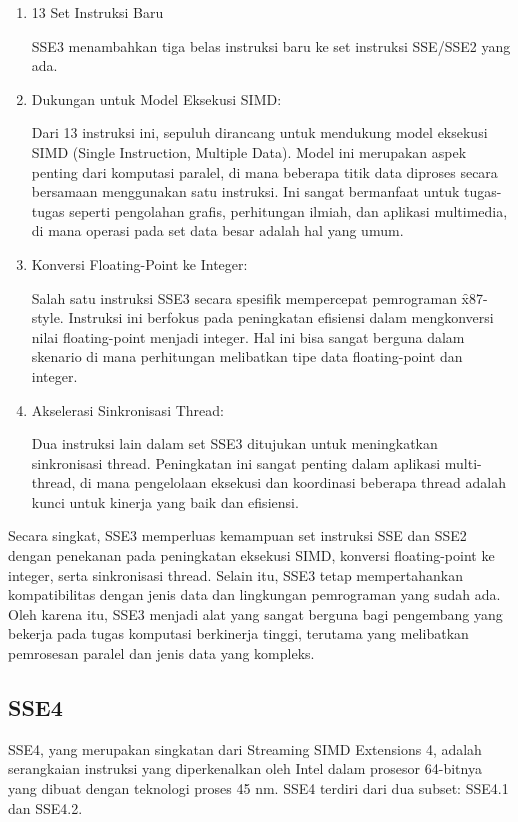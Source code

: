 \begin{enumerate}
	\item 13 Set Instruksi Baru
	
	SSE3 menambahkan tiga belas instruksi baru ke set instruksi SSE/SSE2 yang ada\cite{Hassaballah2008}.
	
	\item Dukungan untuk Model Eksekusi SIMD:
	
	Dari 13 instruksi ini, sepuluh dirancang untuk mendukung model eksekusi SIMD (Single Instruction, Multiple Data). Model ini merupakan aspek penting dari komputasi paralel, di mana beberapa titik data diproses secara bersamaan menggunakan satu instruksi. Ini sangat bermanfaat untuk tugas-tugas seperti pengolahan grafis, perhitungan ilmiah, dan aplikasi multimedia, di mana operasi pada set data besar adalah hal yang umum\cite{Hassaballah2008}.
	 
	\item Konversi Floating-Point ke Integer:
	
	Salah satu instruksi SSE3 secara spesifik mempercepat pemrograman \f{x87-style}. Instruksi ini berfokus pada peningkatan efisiensi dalam mengkonversi nilai floating-point menjadi integer. Hal ini bisa sangat berguna dalam skenario di mana perhitungan melibatkan tipe data floating-point dan integer\cite{Hassaballah2008}.
	 
	\item Akselerasi Sinkronisasi Thread:
	 
	Dua instruksi lain dalam set SSE3 ditujukan untuk meningkatkan sinkronisasi thread. Peningkatan ini sangat penting dalam aplikasi multi-thread, di mana pengelolaan eksekusi dan koordinasi beberapa thread adalah kunci untuk kinerja yang baik dan efisiensi\cite{Hassaballah2008}.
\end{enumerate}

Secara singkat, SSE3 memperluas kemampuan set instruksi SSE dan SSE2 dengan penekanan pada peningkatan eksekusi SIMD, konversi floating-point ke integer, serta sinkronisasi thread. Selain itu, SSE3 tetap mempertahankan kompatibilitas dengan jenis data dan lingkungan pemrograman yang sudah ada. Oleh karena itu, SSE3 menjadi alat yang sangat berguna bagi pengembang yang bekerja pada tugas komputasi berkinerja tinggi, terutama yang melibatkan pemrosesan paralel dan jenis data yang kompleks.

\subsection{SSE4}
SSE4, yang merupakan singkatan dari Streaming SIMD Extensions 4, adalah serangkaian instruksi yang diperkenalkan oleh Intel dalam prosesor 64-bitnya yang dibuat dengan teknologi proses 45 nm. SSE4 terdiri dari dua subset: SSE4.1 dan SSE4.2\cite{sse4reference}.

